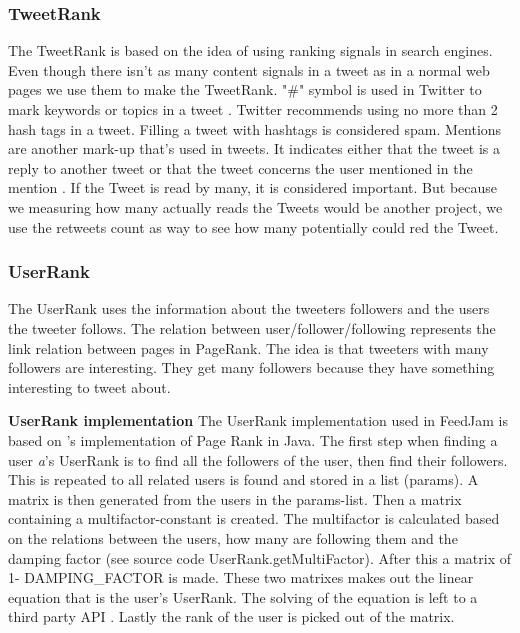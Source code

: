 \subsubsection{TweetRank}
\label{sec:tweetRank}
The TweetRank is based on the idea of using ranking signals in search engines. Even though there isn't as many content signals in a tweet as in a normal web pages we use them to make the TweetRank. "\#" symbol is used in Twitter to mark keywords or topics in a tweet \citep{Twitter}. Twitter recommends using no more than 2 hash tags in a tweet. Filling a tweet with hashtags  is considered spam.
Mentions are another mark-up that's used in tweets. It indicates either that the tweet is a reply to another tweet or that the tweet concerns the user mentioned in the mention \citep{Twitterb}.
If the Tweet is read by many, it is considered important. But because we measuring how many actually reads the Tweets would be another project, we use the retweets count as way to see how many potentially could red the Tweet.

\subsubsection{UserRank}
The UserRank uses the information about the tweeters followers and the users the tweeter follows. The relation between user/follower/following represents the link relation between pages in PageRank. The idea is that tweeters with many followers are interesting. They get many followers because they have something interesting to tweet about. \newline

{\bf UserRank implementation}\newline
The UserRank implementation used in FeedJam is based on \citet{Goodrarzi2009}'s implementation of Page Rank in Java. The first step when finding a user \emph{a}'s UserRank is to find all the followers of the user, then find their followers. This is repeated to all related users is found and stored in a list (params). A matrix is then generated from the users in the params-list. Then a matrix containing a multifactor-constant is created. The multifactor is calculated based on the relations between the users, how many are following them and the damping factor (see source code UserRank.getMultiFactor). After this a matrix of 1- DAMPING\_FACTOR is made. These two matrixes makes out the linear equation that is the user's UserRank. The solving of the equation is left to a third party API \citep{Jama}. Lastly the rank of the user is picked out of the matrix. 


